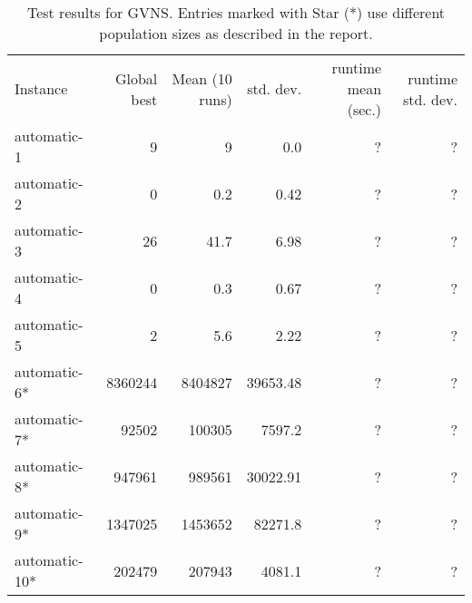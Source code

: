 \documentclass [11pt]{article}
\begin{document}
\begin{sidewaystable}
  \centering
 \label{fig:results}
  \everyrow{\hline}
  \begin{tabu} {| l |r | r |r |r|r |}
  Instance        & Global best   & Mean (10 runs)   & std. dev. & runtime mean (sec.) & runtime std. dev.    \\ 
  automatic-1     & 9             & 9                   & 0.0           &  ? & ?       \\ 
  automatic-2     & 0             & 0.2                & 0.42          &  ? & ?       \\ 
  automatic-3     & 26            & 41.7                & 6.98          &  ? & ?        \\ 
  automatic-4     & 0             & 0.3                 & 0.67          &  ? & ?       \\ 
  automatic-5     & 2             & 5.6                & 2.22          &  ? & ?       \\ 
  automatic-6*     & 8360244       & 8404827           & 39653.48      &  ? & ?        \\ 
  automatic-7*     & 92502        & 100305            & 7597.2       &  ? & ?        \\ 
  automatic-8*     & 947961        & 989561              & 30022.91       &  ? & ?        \\ 
  automatic-9*     & 1347025        & 1453652              & 82271.8        &  ? & ?        \\ 
  automatic-10*    & 202479         & 207943               & 4081.1        &  ? & ?        \\ 
\end{tabu}
\caption{Test results for GVNS. Entries marked with Star (*) use different population sizes as described in the report.} 
\end{sidewaystable}
\end{document}
